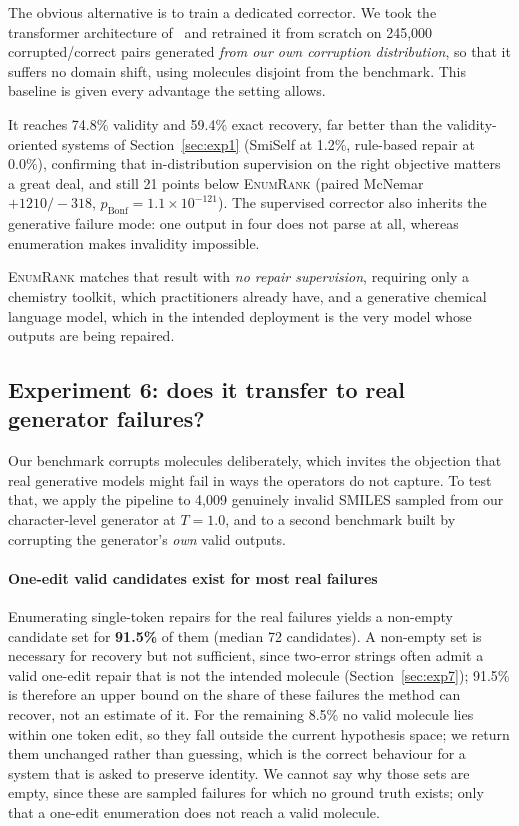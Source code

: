 \documentclass[conference]{IEEEtran}
\newcommand{\ours}{\textsc{EnumRank}}
\begin{document}
The obvious alternative is to train a dedicated corrector. We took the
transformer architecture of~\citet{schoenmaker2023uncorrupt} and retrained it from
scratch on 245{,}000 corrupted/correct pairs generated \emph{from our own
corruption distribution}, so that it suffers no domain shift, using molecules
disjoint from the benchmark. This baseline is given every advantage the setting
allows.

It reaches 74.8\% validity and 59.4\% exact recovery, far better than the
validity-oriented systems of Section~\ref{sec:exp1} (SmiSelf at 1.2\%,
rule-based repair at 0.0\%), confirming that in-distribution supervision on the
right objective matters a great deal, and still 21 points below \ours{} (paired
McNemar $+1210/{-}318$, $p_{\text{Bonf}} = 1.1\times10^{-121}$). The supervised
corrector also inherits the generative failure mode: one output in four does not
parse at all, whereas enumeration makes invalidity impossible.

\ours{} matches that result with \emph{no repair supervision}, requiring only a
chemistry toolkit, which practitioners already have, and a generative chemical
language model, which in the intended deployment is the very model whose outputs
are being repaired.

\subsection{Experiment 6: does it transfer to real generator failures?}\label{sec:exp6}

Our benchmark corrupts molecules deliberately, which invites the objection that
real generative models might fail in ways the operators do not capture. To test
that, we apply the pipeline to 4{,}009 genuinely invalid SMILES sampled from our
character-level generator at $T=1.0$, and to a second benchmark built by
corrupting the generator's \emph{own} valid outputs.

\paragraph{One-edit valid candidates exist for most real failures}
Enumerating single-token repairs for the real failures yields a non-empty
candidate set for \textbf{91.5\%} of them (median 72 candidates). A non-empty
set is necessary for recovery but not sufficient, since two-error strings often
admit a valid one-edit repair that is not the intended molecule
(Section~\ref{sec:exp7}); 91.5\% is therefore an upper bound on the share of these
failures the method can recover, not an estimate of it. For the remaining 8.5\% no valid molecule lies within one
token edit, so they fall outside the current hypothesis space; we return them
unchanged rather than guessing, which is the correct behaviour for a system that
is asked to preserve identity. We cannot say why those sets are empty, since
these are sampled failures for which no ground truth exists; only that a one-edit
enumeration does not reach a valid molecule.
\end{document}
